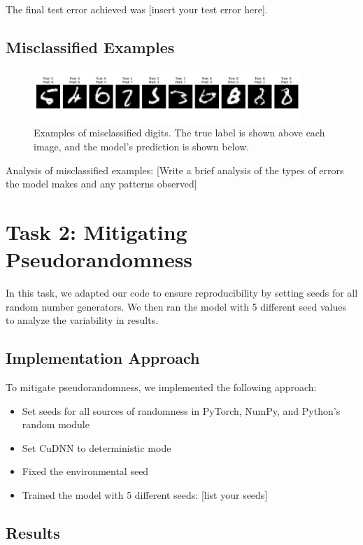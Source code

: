 \documentclass[12pt]{article}
\begin{document}
The final test error achieved was [insert your test error here].

\subsection{Misclassified Examples}

\begin{figure}[H]
    \centering
    \includegraphics[width=0.9\textwidth]{misclassified_images.png}
    \caption{Examples of misclassified digits. The true label is shown above each image, and the model's prediction is shown below.}
    \label{fig:misclassified}
\end{figure}

Analysis of misclassified examples:
[Write a brief analysis of the types of errors the model makes and any patterns observed]

\section{Task 2: Mitigating Pseudorandomness}

In this task, we adapted our code to ensure reproducibility by setting seeds for all random number generators. We then ran the model with 5 different seed values to analyze the variability in results.

\subsection{Implementation Approach}
To mitigate pseudorandomness, we implemented the following approach:
\begin{itemize}
    \item Set seeds for all sources of randomness in PyTorch, NumPy, and Python's random module
    \item Set CuDNN to deterministic mode
    \item Fixed the environmental seed
    \item Trained the model with 5 different seeds: [list your seeds]
\end{itemize}

\subsection{Results}
\end{document}
